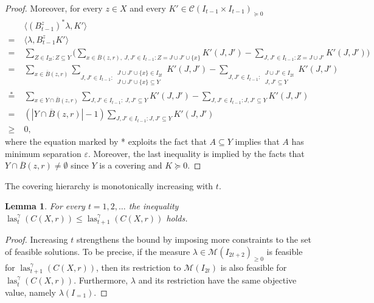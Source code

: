 \documentclass{amsart}
\newtheorem{lemma}[defin]{Lemma}
\DeclareMathOperator{\las}{las}
\begin{document}
\begin{proof}
Moreover, for every $z \in X$ and every $K' \in \mathcal{C}(I_{t-1}\times I_{t-1})_{\succeq 0}$
\[
\begin{split}
  & \langle (B_{t-1}^z)^* \lambda, K' \rangle\\
  = \; & \langle
                \lambda, B_{t-1}^z K'\rangle \\
		= \; & \sum_{Z\in I_{2t} :  Z\subseteq Y} \Big(\sum_{x \in
                  \overline{B}(z,r),\ J,J'\in I_{t-1} :  Z = J \cup J'
                  \cup \{x\} } K'(J,J')  -\sum_{J,J'\in I_{t-1} : Z = J \cup J'} K'(J,J')\Big)\\
          =\; & \sum_{x\in \overline{B}(z,r)} \sum_{J,J'\in I_{t-1}
          	:\ \substack{J\cup J' \cup \{x\}\in I_{2t}\\ J\cup J'\cup \{x\} \subseteq Y}} K'(J,J') -\sum_{J,J'\in I_{t-1}:\ \substack{J\cup J' \in I_{2t}\\ J,J'\subseteq Y}} K'(J,J')\\
          \overset{*}{=} \; & \sum_{x\in Y \cap \overline{B}(z,r)} \sum_{J,J'\in I_{t-1}
          	:\ J,J'\subseteq Y} K'(J,J') -\sum_{J,J'\in I_{t-1} :
          	J,J'\subseteq Y} K'(J,J')\\
                 = \; & (|Y \cap \overline{B}(z,r)| - 1) \sum_{J,J'\in I_{t-1}:
                  J,J'\subseteq Y} K'(J,J')\\
          \geq \; & 0,
\end{split}
\]
where the equation marked by * exploits the fact that $A\subseteq Y$ implies that $A$ has minimum separation $\varepsilon$. Moreover, the last inequality is implied by the facts that
$Y \cap \overline{B}(z,r) \neq \emptyset$ since $Y$ is a covering and $K\succeq 0$.
\end{proof}

%

The covering hierarchy is monotonically increasing with $t$.

\begin{lemma}
For every $t = 1, 2, \ldots$ the inequality
  $\las^\gamma_t(C(X,r)) \leq \las^\gamma_{t+1}(C(X,r))$ holds.
\end{lemma}

\begin{proof}
  Increasing $t$ strengthens the bound by imposing more constraints to
  the set of feasible solutions. To be precise, if the measure
  $\lambda \in \mathcal{M}(I_{2t+2})_{\geq 0}$ is feasible for
  $\las^\gamma_{t+1}(C(X,r))$, then its restriction to
  $\mathcal{M}(I_{2t})$ is also feasible for
  $\las^\gamma_t(C(X,r))$. Furthermore, $\lambda$ and its
  restriction have the same objective value, namely $\lambda(I_{=1})$.
\end{proof}
\end{document}
